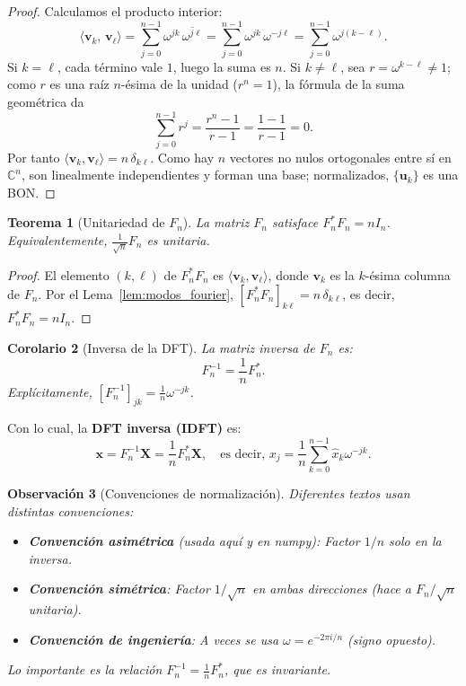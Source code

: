 \documentclass[a4paper,11pt]{report}
\newtheorem{theorem}{Teorema}[chapter]
\newtheorem{corollary}[theorem]{Corolario}
\newtheorem{remark}[theorem]{Observación}
\begin{document}
\begin{proof}
Calculamos el producto interior:
\[
\langle \mathbf{v}_k,\, \mathbf{v}_\ell \rangle
= \sum_{j=0}^{n-1} \omega^{jk}\,\overline{\omega^{j\ell}}
= \sum_{j=0}^{n-1} \omega^{jk}\,\omega^{-j\ell}
= \sum_{j=0}^{n-1} \omega^{j(k - \ell)}.
\]
Si $k = \ell$, cada término vale $1$, luego la suma es $n$. Si $k \neq \ell$, sea $r = \omega^{k-\ell} \neq 1$; como $r$ es una raíz $n$-ésima de la unidad ($r^n = 1$), la fórmula de la suma geométrica da
\[
\sum_{j=0}^{n-1} r^j = \frac{r^n - 1}{r - 1} = \frac{1 - 1}{r - 1} = 0.
\]
Por tanto $\langle \mathbf{v}_k, \mathbf{v}_\ell \rangle = n\,\delta_{k\ell}$.
Como hay $n$ vectores no nulos ortogonales entre sí en $\mathbb{C}^n$, son linealmente independientes y forman una base; normalizados, $\{\mathbf{u}_k\}$ es una BON.
\end{proof}

\begin{theorem}[Unitariedad de $F_n$]\label{thm:dft_unitary}
La matriz $F_n$ satisface $F_n^* F_n = n I_n$. Equivalentemente, $\frac{1}{\sqrt{n}} F_n$ es unitaria.
\end{theorem}

\begin{proof}
El elemento $(k,\ell)$ de $F_n^* F_n$ es $\langle \mathbf{v}_k, \mathbf{v}_\ell \rangle$, donde $\mathbf{v}_k$ es la $k$-ésima columna de $F_n$. Por el Lema~\ref{lem:modos_fourier}, $[F_n^* F_n]_{k\ell} = n\,\delta_{k\ell}$, es decir, $F_n^* F_n = n I_n$.
\end{proof}

\begin{corollary}[Inversa de la DFT]
La matriz inversa de $F_n$ es:
\[
F_n^{-1} = \frac{1}{n} F_n^*.
\]
Explícitamente, $[F_n^{-1}]_{jk} = \frac{1}{n} \omega^{-jk}$.
\end{corollary}

Con lo cual, la \textbf{DFT inversa (IDFT)} es:
\[
\mathbf{x} = F_n^{-1} \mathbf{X} = \frac{1}{n} F_n^* \mathbf{X}, \quad \text{es decir, } x_j = \frac{1}{n} \sum_{k=0}^{n-1} \hat{x}_k \omega^{-jk}.
\]

\begin{remark}[Convenciones de normalización]
Diferentes textos usan distintas convenciones:
\begin{itemize}
\item \textbf{Convención asimétrica} (usada aquí y en numpy): Factor $1/n$ solo en la inversa.
\item \textbf{Convención simétrica}: Factor $1/\sqrt{n}$ en ambas direcciones (hace a $F_n/\sqrt{n}$ unitaria).
\item \textbf{Convención de ingeniería}: A veces se usa $\omega = e^{-2\pi i/n}$ (signo opuesto).
\end{itemize}
Lo importante es la relación $F_n^{-1} = \frac{1}{n} F_n^*$, que es invariante.
\end{remark}
\end{document}
